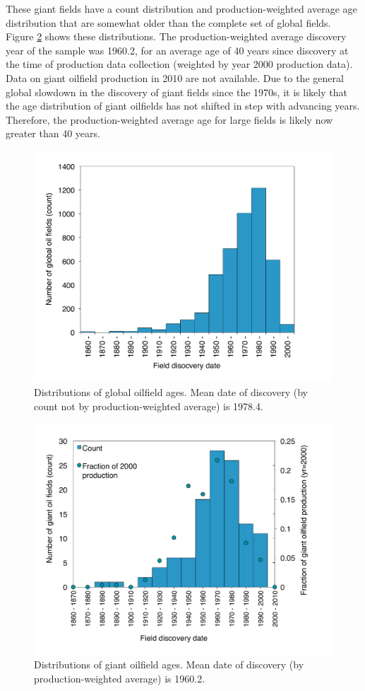\documentclass[11pt]{report}
\begin{document}
These giant fields have a count distribution and production-weighted average age distribution that are somewhat older than the complete set of global fields. Figure \ref{fig:age_distribution_giant} shows these distributions. The production-weighted average discovery year of the sample was 1960.2, for an average age of 40 years since discovery at the time of production data collection (weighted by year 2000 production data). Data on giant oilfield production in 2010 are not available. Due to the general global slowdown in the discovery of giant fields since the 1970s, it is likely that the age distribution of giant oilfields has not shifted in step with advancing years. Therefore, the production-weighted average age for large fields is likely now greater than 40 years.

\begin{figure}[t]
\includegraphics[width=0.85\columnwidth]{images/age_distribution_all.pdf}
\caption{Distributions of global oilfield ages. Mean date of discovery (by count not by production-weighted average) is 1978.4.}
\label{fig:age_distribution_all}
\end{figure}

\begin{figure}[t]
\includegraphics[width=0.85\columnwidth]{images/age_distribution_giant.pdf}
\caption{Distributions of giant oilfield ages. Mean date of discovery (by production-weighted average) is 1960.2.}
\label{fig:age_distribution_giant}
\end{figure}
\end{document}
